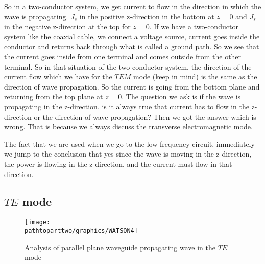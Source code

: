 So in a two-conductor system, we get current to flow in the direction in which the wave is propagating. ${J_s}$ in the positive z-direction in the bottom at $z=0$ and ${J_s}$ in the negative z-direction at the top for $z=0$. If we have a two-conductor system like the coaxial cable, we connect a voltage source, current goes inside the conductor and returns back through what is called a ground path. So we see that the current goes inside from one terminal and comes outside from the other terminal. So in that situation of the two-conductor system, the direction of the current flow which we have for the $TEM$ mode (keep in mind) is the same as the direction of wave propagation. So the current is going from the bottom plane and returning from the top plane at $z=0$. The question we ask is if the wave is propagating in the z-direction, is it always true that current has to flow in the z-direction or the direction of wave propagation? Then we got the answer which is wrong. That is because we always discuss the transverse electromagnetic mode.

The fact that we are used when we go to the low-frequency circuit, immediately we jump to the conclusion that yes since the wave is moving in the z-direction, the power is flowing in the z-direction, and the current must flow in that direction.

\subsection{$TE$ mode}
\begin{figure}[h]
\centering
\texttt{[image: \\pathtoparttwo/graphics/WATSON4]}
\caption{Analysis of parallel plane waveguide propagating wave in the $TE$ mode}
\end{figure}

